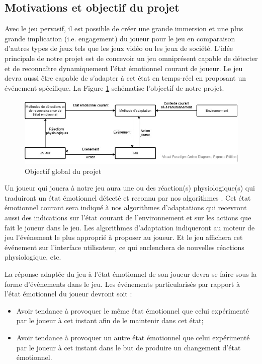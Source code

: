 \documentclass[11pt]{article}
\begin{document}
	\subsection{Motivations et objectif du projet}\label{sec:objectif}
		Avec le jeu pervasif, il est possible de créer une grande immersion et une plus grande implication (i.e. engagement) du joueur pour le jeu en comparaison d'autres types de jeux tels que les jeux vidéo ou les jeux de société.
		L'idée principale de notre projet est de concevoir un jeu omniprésent capable de détecter et de reconnaître dynamiquement l'état émotionnel courant de joueur.
		Le jeu devra aussi être capable de s'adapter à cet état en temps-réel en proposant un événement spécifique.
		La Figure \ref{fig:motivation} schématise l'objectif de notre projet.
		\begin{figure}
			\centering
			\includegraphics[scale=0.75]{../include/motivation.jpg}
			\caption{Objectif global du projet}
			\label{fig:motivation}
		\end{figure}
		Un joueur qui jouera à notre jeu aura une ou des réaction(s) physiologique(s) qui traduiront un état émotionnel détecté et reconnu par nos algorithmes \cite{gal_2019,gal_et_al._2020}.
		Cet état émotionnel courant sera indiqué à nos algorithmes d'adaptations qui recevront aussi des indications sur l'état courant de l'environnement et sur les actions que fait le joueur dans le jeu.
		Les algorithmes d'adaptation indiqueront au moteur de jeu l'événement le plus approprié à proposer au joueur.
		Et le jeu affichera cet événement sur l'interface utilisateur, ce qui enclenchera de nouvelles réactions physiologique, etc.\par
		La réponse adaptée du jeu à l'état émotionnel de son joueur devra se faire sous la forme d'événements dans le jeu.
		Les événements particularisés par rapport à l'état émotionnel du joueur devront soit :
		\begin{itemize}
			\item Avoir tendance à provoquer le même état émotionnel que celui expérimenté par le joueur à cet instant afin de le maintenir dans cet état;
			\item Avoir tendance à provoquer un autre état émotionnel que celui expérimenté par le joueur à cet instant dans le but de produire un changement d'état émotionnel.
		\end{itemize}
\end{document}
